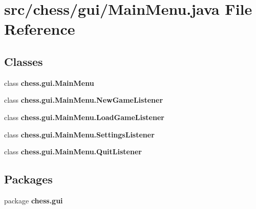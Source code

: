 \section{src/chess/gui/\+Main\+Menu.java File Reference}
\label{_main_menu_8java}
\subsection*{Classes}
\begin{DoxyCompactItemize}
\item 
class {\bf chess.\+gui.\+Main\+Menu}
\item 
class {\bf chess.\+gui.\+Main\+Menu.\+New\+Game\+Listener}
\item 
class {\bf chess.\+gui.\+Main\+Menu.\+Load\+Game\+Listener}
\item 
class {\bf chess.\+gui.\+Main\+Menu.\+Settings\+Listener}
\item 
class {\bf chess.\+gui.\+Main\+Menu.\+Quit\+Listener}
\end{DoxyCompactItemize}
\subsection*{Packages}
\begin{DoxyCompactItemize}
\item 
package {\bf chess.\+gui}
\end{DoxyCompactItemize}
